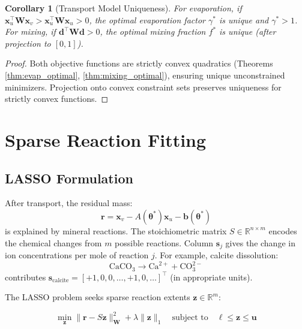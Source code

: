 \documentclass[12pt,a4paper]{article}
\theoremstyle{plain}
\newtheorem{corollary}[theorem]{Corollary}
\theoremstyle{definition}
\theoremstyle{remark}
\begin{document}
\begin{corollary}[Transport Model Uniqueness]\label{cor:transport_unique}
	For evaporation, if $\mathbf{x}_u^\top \mathbf{W} \mathbf{x}_v > \mathbf{x}_u^\top \mathbf{W} \mathbf{x}_u > 0$, the optimal evaporation factor $\gamma^*$ is unique and $\gamma^* > 1$. For mixing, if $\mathbf{d}^\top \mathbf{W} \mathbf{d} > 0$, the optimal mixing fraction $f^*$ is unique (after projection to $[0,1]$).
\end{corollary}

\begin{proof}
	Both objective functions are strictly convex quadratics (Theorems \ref{thm:evap_optimal}, \ref{thm:mixing_optimal}), ensuring unique unconstrained minimizers. Projection onto convex constraint sets preserves uniqueness for strictly convex functions.
\end{proof}
\newpage
\section{Sparse Reaction Fitting}\label{sec:reaction}

\subsection{LASSO Formulation}

After transport, the residual mass:
\begin{equation}
	\mathbf{r} = \mathbf{x}_v - A(\boldsymbol{\theta}^*)\mathbf{x}_u - \mathbf{b}(\boldsymbol{\theta}^*)
\end{equation}
is explained by mineral reactions. The stoichiometric matrix $S \in \mathbb{R}^{n \times m}$ encodes the chemical changes from $m$ possible reactions. Column $\mathbf{s}_j$ gives the change in ion concentrations per mole of reaction $j$. For example, calcite dissolution:
\begin{equation}
	\text{CaCO}_3 \to \text{Ca}^{2+} + \text{CO}_3^{2-}
\end{equation}
contributes $\mathbf{s}_{\text{calcite}} = [+1, 0, 0, \ldots, +1, 0, \ldots]^\top$ (in appropriate units).

The LASSO problem seeks sparse reaction extents $\mathbf{z} \in \mathbb{R}^m$:

\begin{equation}\label{eq:lasso}
	\min_{\mathbf{z}} \|\mathbf{r} - S\mathbf{z}\|_{\mathbf{W}}^2 + \lambda \|\mathbf{z}\|_1 \quad \text{subject to} \quad \boldsymbol{\ell} \leq \mathbf{z} \leq \mathbf{u}
\end{equation}
\end{document}
